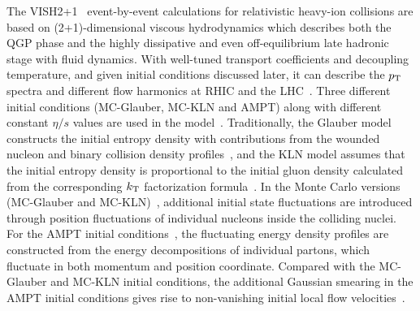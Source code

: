 The VISH2+1~\cite{Shen:2010uy,Shen:2014vra} event-by-event calculations for relativistic heavy-ion collisions are based on (2+1)-dimensional viscous hydrodynamics which describes both the QGP phase and the highly dissipative and even off-equilibrium late hadronic stage with fluid dynamics. With well-tuned transport coefficients and decoupling temperature, and given initial conditions discussed later, it can describe the $p_{\rm T}$ spectra and different flow harmonics at RHIC and the LHC~\cite{Qiu:2011hf, Shen:2010uy, Shen:2011eg, Bhalerao:2015iya}.
Three different initial conditions ({MC-Glauber}, {MC-KLN} and {AMPT}) along with different constant $\eta/s$ values are used in the model~\cite{Zhu:2016puf}. 
Traditionally, the Glauber model constructs the initial entropy density with contributions from the wounded nucleon and binary collision density profiles~\cite{Kolb:2000sd}, and the {KLN} model assumes that the initial entropy density is proportional to the initial gluon density calculated from the corresponding $k_{\rm T}$ factorization formula~\cite{Kharzeev:2000ph}. In the Monte Carlo versions ({MC-Glauber} and {MC-KLN})~\cite{Miller:2007ri,Drescher:2006ca,Hirano:2009ah}, additional initial state fluctuations are introduced through position fluctuations of individual nucleons inside the colliding nuclei. For the {AMPT} initial conditions~\cite{Bhalerao:2015iya,Pang:2012he,Xu:2016hmp}, the fluctuating energy density profiles are constructed from the energy decompositions of individual partons, which fluctuate in both momentum and position coordinate. Compared with the {MC-Glauber} and {MC-KLN} initial conditions, the additional Gaussian smearing in the {AMPT} initial conditions gives rise to non-vanishing initial local flow velocities~\cite{Pang:2012he}.

